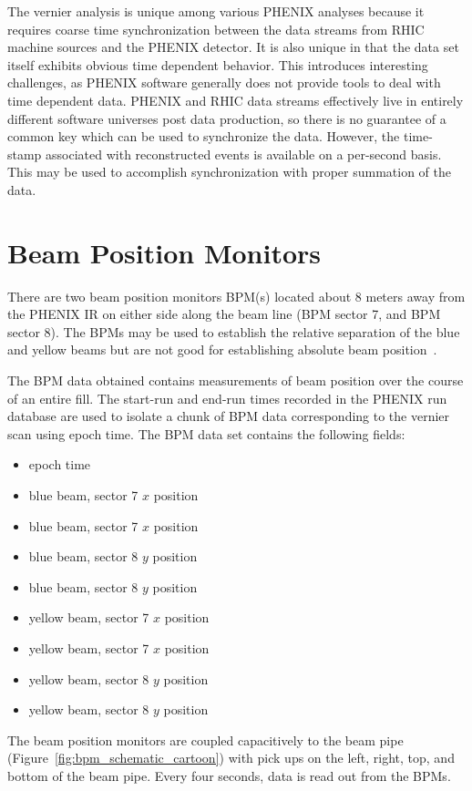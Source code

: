 The vernier analysis is unique among various PHENIX analyses because it requires
coarse time synchronization between the data streams from RHIC machine sources
and the PHENIX detector. It is also unique in that the data set itself exhibits
obvious time dependent behavior. This introduces interesting challenges, as
PHENIX software generally does not provide tools to deal with time dependent
data. PHENIX and RHIC data streams effectively live in entirely different
software universes post data production, so there is no guarantee of a common
key which can be used to synchronize the data. However, the time-stamp
associated with reconstructed events is available on a per-second basis. This
may be used to accomplish synchronization with proper summation of the data.

\clearpage
\section{Beam Position Monitors}
\label{sec:beam_position_monitoring}
There are two beam position monitors BPM(s) located about 8 meters away from the
PHENIX IR on either side along the beam line (BPM sector 7, and BPM sector 8).
The BPMs may be used to establish the relative separation of the blue and yellow
beams but are not good for establishing absolute beam position~\cite{Drees2013}.

The BPM data obtained contains measurements of beam position over the course of
an entire fill. The start-run and end-run times recorded in the PHENIX run
database are used to isolate a chunk of BPM data corresponding to the vernier
scan using epoch time. The BPM data set contains the following fields:
\begin{itemize}
\item epoch time
\item blue beam, sector 7 $x$ position
\item blue beam, sector 7 $x$ position
\item blue beam, sector 8 $y$ position
\item blue beam, sector 8 $y$ position
\item yellow beam, sector 7 $x$ position
\item yellow beam, sector 7 $x$ position
\item yellow beam, sector 8 $y$ position
\item yellow beam, sector 8 $y$ position
\end{itemize}

The beam position monitors are coupled capacitively to the beam pipe
(Figure~\ref{fig:bpm_schematic_cartoon}) with pick ups on the left, right, top,
and bottom of the beam pipe. Every four seconds, data is read out from the BPMs.

